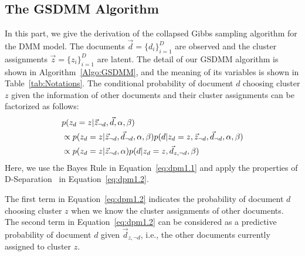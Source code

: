 \subsection{The GSDMM Algorithm} \label{GSDMM}
In this part, we give the derivation of the collapsed Gibbs sampling algorithm for the DMM model. The documents $\vec{d}=\{d_i\}_{i=1}^D$ are observed and the cluster assignments $\vec{z} = \{z_i\}_{i=1}^D$ are latent. The detail of our GSDMM algorithm is shown in Algorithm~\ref{Algo:GSDMM}, and the meaning of its variables is shown in Table~\ref{tab:Notations}. The conditional probability of document $d$ choosing cluster $z$ given the information of other documents and their cluster assignments can be factorized as follows:
\begin{align}
    & \notag
    p(z_d=z | \vec{z}_{\neg{d}}, \vec{d}, \alpha, \beta)\\
    & \label{eq:dpm1.1}
    \propto p(z_d=z | \vec{z}_{\neg{d}}, \vec{d}_{\neg{d}}, \alpha, \beta)
            p(d | z_d=z, \vec{z}_{\neg{d}}, \vec{d}_{\neg{d}}, \alpha, \beta)\\
    & \label{eq:dpm1.2}
    \propto p(z_d=z | \vec{z}_{\neg{d}}, \alpha)
            p(d | z_d=z, \vec{d}_{z, \neg{d}}, \beta)
\end{align}
Here, we use the Bayes Rule in Equation~\eqref{eq:dpm1.1} and apply the properties of D-Separation~\cite{bishop2006pattern} in Equation~\eqref{eq:dpm1.2}.

The first term in Equation~\eqref{eq:dpm1.2} indicates the probability of document $d$ choosing cluster $z$ when we know the cluster assignments of other documents. The second term in Equation~\eqref{eq:dpm1.2} can be considered as a predictive probability of document $d$ given $\vec{d}_{z, \neg{d}}$, i.e., the other documents currently assigned to cluster $z$.

